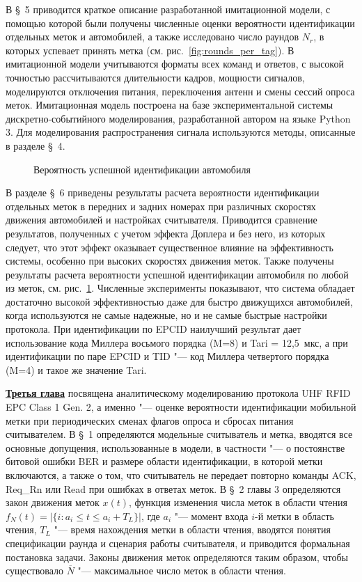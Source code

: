 В \S~5 приводится краткое описание разработанной имитационной модели, с помощью которой были получены численные оценки вероятности идентификации отдельных меток и автомобилей, а также исследовано число раундов $N_r$, в которых успевает принять метка (см. рис.~\ref{fig:rounds_per_tag}). В имитационной модели учитываются форматы всех команд и ответов, с высокой точностью рассчитываются длительности кадров, мощности сигналов, моделируются отключения питания, переключения антенн и смены сессий опроса меток. Имитационная модель построена на базе экспериментальной системы дискретно-событийного моделирования, разработанной автором на языке Python 3. Для моделирования распространения сигнала используются методы, описанные в разделе \S~4.

\begin{figure}[ht]
  \caption{Вероятность успешной идентификации автомобиля}\label{fig:vehicle_identification_rate}
\end{figure}

В разделе \S~6 приведены результаты расчета вероятности идентификации отдельных меток в передних и задних номерах при различных скоростях движения автомобилей и настройках считывателя. Приводится сравнение результатов, полученных с учетом эффекта Доплера и без него, из которых следует, что этот эффект оказывает существенное влияние на эффективность системы, особенно при высоких скоростях движения меток. Также получены результаты расчета вероятности успешной идентификации автомобиля по любой из меток, см. рис.~\ref{fig:vehicle_identification_rate}. Численные эксперименты показывают, что система обладает достаточно высокой эффективностью даже для быстро движущихся автомобилей, когда используются не самые надежные, но и не самые быстрые настройки протокола. При идентификации по EPCID наилучший результат дает использование кода Миллера восьмого порядка (M=8) и Tari = 12,5~мкс, а при идентификации по паре EPCID и TID "--- код Миллера четвертого порядка (M=4) и такое же значение Tari.




\underline{\textbf{Третья глава}} посвящена аналитическому моделированию протокола UHF RFID EPC Class 1 Gen. 2, а именно "--- оценке вероятности идентификации мобильной метки при периодических сменах флагов опроса и сбросах питания считывателем. В \S~1 определяются модельные считыватель и метка, вводятся все основные допущения, использованные в модели, в частности "--- о постоянстве битовой ошибки BER и размере области идентификации, в которой метки включаются, а также о том, что считыватель не передает повторно команды ACK, Req\_Rn или Read при ошибках в ответах меток. В \S~2 главы 3 определяются закон движения меток $x(t)$, функция изменения числа меток в области чтения $f_N(t) = | \{ i: a_i \leqslant t \leqslant a_i + T_L \} |$, где $a_i$ "--- момент входа $i$-й метки в область чтения, $T_L$ "--- время нахождения метки в области чтения, вводятся понятия спецификации раунда и сценария работы считывателя, и приводится формальная постановка задачи. Законы движения меток определяются таким образом, чтобы существовало $\overline{N}$ "--- максимальное число меток в области чтения.

